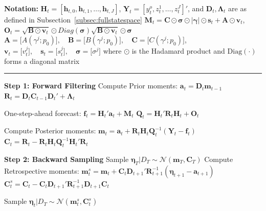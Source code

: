 \documentclass[APA,STIX1COL]{WileyNJD-v2}
\begin{document}
\begin{algorithm}
\caption{MCMC - Forward Filtering Backward Sampling (FFBS)}
\label{alg:Alg2}
\begin{algorithmic}

\State \textbf{Notation:}
\State  $\mathbf{H}_t = [\mathbf{h}_{t,0}, \mathbf{h}_{t,1}, \ldots, \mathbf{h}_{t,J}]$, $\mathbf{Y}_t = [y_t^o, z_t^1, \ldots, z_t^J]'$, and $\mathbf{D}_t, \boldsymbol{\Lambda}_t$ are as defined in Subsection~\ref{subsec:fullstatespace}
\State $\mathbf{M}_t= \mathbf{C} \odot  \mathbf{\sigma} \odot | \mathbf{\gamma} | \odot \mathbf{s}_t + \mathbf{A} \odot \mathbf{v}_t$, \quad $\mathbf{O}_t= \sqrt{\mathbf{B} \odot \mathbf{v}_t} \odot Diag
(\mathbf{\sigma}) \sqrt{\mathbf{B} \odot \mathbf{v}_t} \odot \mathbf{\sigma}$
\State  \(
\mathbf{A} = \big[ A(\gamma^j;p_0)   \big], \quad \mathbf{B} = \big[  B(\gamma^j;p_0)  \big], \quad \mathbf{C} = \big[ C(\gamma^j;p_0)   \big] \), 
\State \( \mathbf{v}_t = \big[  v^j_t   \big], \quad  \mathbf{s}_t = \big[ 
s^j_t  \big] , \quad \mathbf{\sigma} = \big[ \sigma^j  \big]
\)
\State where \(\odot\) is the Hadamard product and \(\mathrm{Diag}(\cdot)\) forms a diagonal matrix
\vspace{0.1cm}
\Statex \rule{\linewidth}{0.4pt}
\vspace{0.1cm}

\State \textbf{Step 1: Forward Filtering}
    \State Compute Prior moments:
    \State $\mathbf{a}_t = \mathbf{D}_t \mathbf{m}_{t-1}$
    \State $\mathbf{R}_t = \mathbf{D}_t \mathbf{C}_{t-1} \mathbf{D}_t' +  \boldsymbol{\Lambda}_t$

    \State One-step-ahead forecast:
    \State $\mathbf{f}_t = \mathbf{H}_t' \mathbf{a}_t + \mathbf{M}_t$
    \State $\mathbf{Q}_t = \mathbf{H}_t' \mathbf{R}_t \mathbf{H}_t + \mathbf{O}_t$
    
    \State Compute Posterior moments:
    \State $\mathbf{m}_t = \mathbf{a}_t + \mathbf{R}_t \mathbf{H}_t \mathbf{Q}_t^{-1}(\mathbf{Y}_t - \mathbf{f}_t)$
    \State $\mathbf{C}_t = \mathbf{R}_t - \mathbf{R}_t \mathbf{H}_t \mathbf{Q}_t^{-1} \mathbf{H}_t' \mathbf{R}_t$
\EndFor

\State \textbf{Step 2: Backward Sampling}
        \State Sample $\boldsymbol{\eta}_T | D_T \sim \mathcal{N}(\mathbf{m}_T, \mathbf{C}_T)$
    \Else
        \State Compute Retrospective moments:
        \State $\mathbf{m}_t^s = \mathbf{m}_t + \mathbf{C}_t \mathbf{D}_{t+1}' \mathbf{R}_{t+1}^{-1} (\boldsymbol{\eta}_{t+1} - \mathbf{a}_{t+1})$
        \State $\mathbf{C}_t^s = \mathbf{C}_t - \mathbf{C}_t \mathbf{D}_{t+1}' \mathbf{R}_{t+1}^{-1} \mathbf{D}_{t+1} \mathbf{C}_t$
        
        \State Sample $\boldsymbol{\eta}_t | D_T \sim \mathcal{N}(\mathbf{m}_t^s, \mathbf{C}_t^s)$
    \EndIf
\EndFor

\end{algorithmic}
\end{algorithm}
\end{document}
